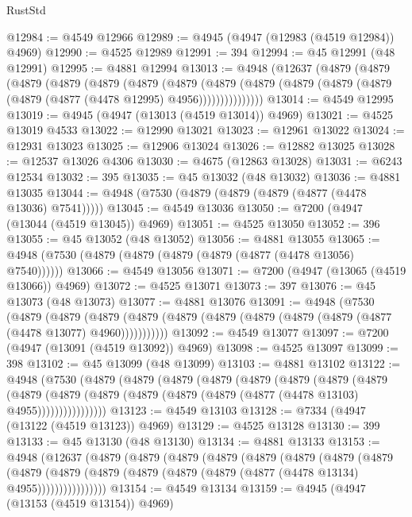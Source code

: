 \begin{lexlean}{RustStd}
\begin{coremodule}
{\begin{coremodule}
{{{{{{{{{{{{{{{{{{{{{{{{{{{{{{{{{{{{{{{{{{{{{{{{{{{{{{{{{{{{@12984 := @4549 @12966
@12989 := @4945 (@4947 (@12983 (@4519 @12984)) @4969)
@12990 := @4525 @12989
@12991 := 394
@12994 := @45 @12991 (@48 @12991)
@12995 := @4881 @12994
@13013 := @4948
    (@12637
      (@4879
        (@4879
          (@4879
            (@4879
              (@4879
                (@4879
                  (@4879
                    (@4879
                      (@4879 (@4879 (@4879 (@4879 (@4879 (@4877 (@4478 @12995) @4956)))))))))))))))
@13014 := @4549 @12995
@13019 := @4945 (@4947 (@13013 (@4519 @13014)) @4969)
@13021 := @4525 @13019 @4533
@13022 := @12990 @13021
@13023 := @12961 @13022
@13024 := @12931 @13023
@13025 := @12906 @13024
@13026 := @12882 @13025
@13028 := @12537 @13026 @4306
@13030 := @4675 (@12863 @13028)
@13031 := @6243 @12534
@13032 := 395
@13035 := @45 @13032 (@48 @13032)
@13036 := @4881 @13035
@13044 := @4948 (@7530 (@4879 (@4879 (@4879 (@4877 (@4478 @13036) @7541)))))
@13045 := @4549 @13036
@13050 := @7200 (@4947 (@13044 (@4519 @13045)) @4969)
@13051 := @4525 @13050
@13052 := 396
@13055 := @45 @13052 (@48 @13052)
@13056 := @4881 @13055
@13065 := @4948 (@7530 (@4879 (@4879 (@4879 (@4879 (@4877 (@4478 @13056) @7540))))))
@13066 := @4549 @13056
@13071 := @7200 (@4947 (@13065 (@4519 @13066)) @4969)
@13072 := @4525 @13071
@13073 := 397
@13076 := @45 @13073 (@48 @13073)
@13077 := @4881 @13076
@13091 := @4948
    (@7530
      (@4879
        (@4879
          (@4879 (@4879 (@4879 (@4879 (@4879 (@4879 (@4879 (@4877 (@4478 @13077) @4960)))))))))))
@13092 := @4549 @13077
@13097 := @7200 (@4947 (@13091 (@4519 @13092)) @4969)
@13098 := @4525 @13097
@13099 := 398
@13102 := @45 @13099 (@48 @13099)
@13103 := @4881 @13102
@13122 := @4948
    (@7530
      (@4879
        (@4879
          (@4879
            (@4879
              (@4879
                (@4879
                  (@4879
                    (@4879
                      (@4879
                        (@4879
                          (@4879 (@4879 (@4879 (@4879 (@4877 (@4478 @13103) @4955))))))))))))))))
@13123 := @4549 @13103
@13128 := @7334 (@4947 (@13122 (@4519 @13123)) @4969)
@13129 := @4525 @13128
@13130 := 399
@13133 := @45 @13130 (@48 @13130)
@13134 := @4881 @13133
@13153 := @4948
    (@12637
      (@4879
        (@4879
          (@4879
            (@4879
              (@4879
                (@4879
                  (@4879
                    (@4879
                      (@4879
                        (@4879
                          (@4879 (@4879 (@4879 (@4879 (@4877 (@4478 @13134) @4955))))))))))))))))
@13154 := @4549 @13134
@13159 := @4945 (@4947 (@13153 (@4519 @13154)) @4969)
}}}}}}}}}}}}}}}}}}}}}}}}}}}}}}}}}}}}}}}}}}}}}}}}}}}}}}}}}}}}
\end{coremodule}}
\end{coremodule}
\end{lexlean}
